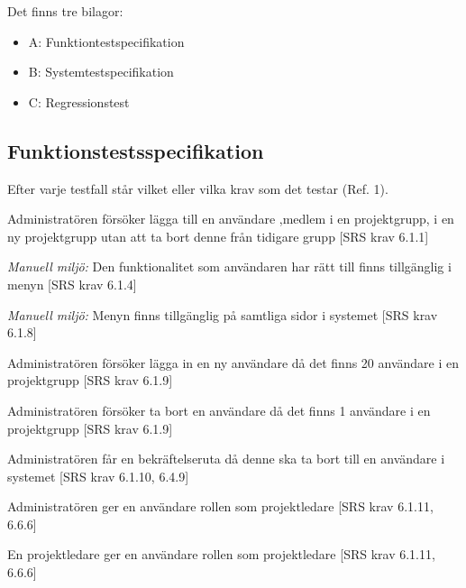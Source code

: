 \documentclass[a4paper]{article}
\begin{document}
Det finns tre bilagor:

\begin{itemize}
\item A: Funktiontestspecifikation
\item B: Systemtestspecifikation
\item C: Regressionstest

\end{itemize}

\newpage

\begin{appendices}

\section{Funktionstestsspecifikation}
Efter varje testfall står vilket eller vilka krav som det testar (Ref. 1).

\begin{FT}


\item
Administratören försöker lägga till en användare ,medlem i en projektgrupp, i en ny projektgrupp utan att ta bort denne från tidigare grupp [SRS krav 6.1.1]

\item
\emph{Manuell miljö:} Den funktionalitet som användaren har rätt till finns tillgänglig i menyn [SRS krav 6.1.4]

\item
\emph{Manuell miljö:} Menyn finns tillgänglig på samtliga sidor i systemet [SRS krav 6.1.8]

\item
Administratören försöker lägga in en ny användare då det finns 20 användare i en projektgrupp [SRS krav 6.1.9]

\item
Administratören försöker ta bort en användare då det finns 1 användare i en projektgrupp [SRS krav 6.1.9]

\item
Administratören får en bekräftelseruta då denne ska ta bort till en användare i systemet [SRS krav 6.1.10, 6.4.9]

\item
Administratören ger en användare rollen som projektledare [SRS krav 6.1.11, 6.6.6]

\item
En projektledare ger en användare rollen som projektledare [SRS krav 6.1.11, 6.6.6]


\end{FT}
\end{appendices}
\end{document}

